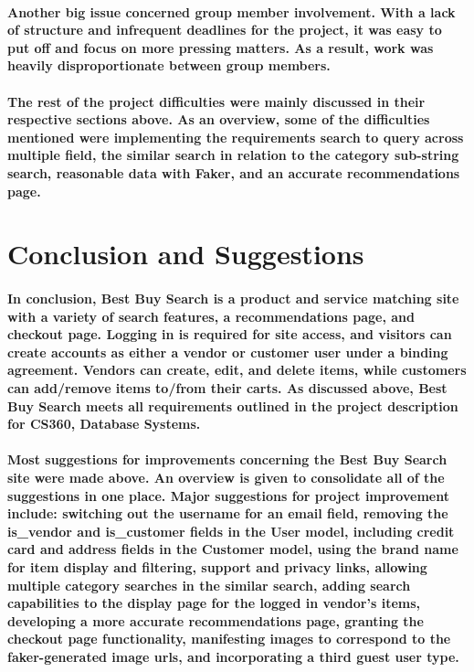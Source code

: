 \documentclass[sigconf]{acmart}
\begin{document}
\paragraph{ Another big issue concerned group member involvement. With a lack of structure and infrequent deadlines for the project, it was easy to put off and focus on more pressing matters. As a result, work was heavily  disproportionate between group members. }

\paragraph{ The rest of the project difficulties were mainly discussed in their respective sections above. As an overview, some of the difficulties mentioned were implementing the requirements search to query across multiple field, the similar search in relation to the category sub-string search, reasonable data with Faker, and an accurate recommendations page.  }

\section{Conclusion and Suggestions}

\paragraph{ In conclusion, Best Buy Search is a product and service matching site with a variety of search features, a recommendations page, and checkout page. Logging in is required for site access, and visitors can create accounts as either a vendor or customer user under a binding agreement. Vendors can create, edit, and delete items, while customers can add/remove items to/from their carts. As discussed above, Best Buy Search meets all requirements outlined in the project description for CS360, Database Systems. }

\paragraph{ Most suggestions for improvements concerning the Best Buy Search site were made above. An overview is given to consolidate all of the suggestions in one place. Major suggestions for project improvement include: switching out the username for an email field, removing the is\_vendor and is\_customer fields in the User model, including credit card and address fields in the Customer model, using the brand name for item display and filtering, support and privacy links, allowing multiple category searches in the similar search, adding search capabilities to the display page for the logged in vendor's items, developing a more accurate recommendations page, granting the checkout page functionality, manifesting images to correspond to the faker-generated image urls, and incorporating a third guest user type.  }
\end{document}
